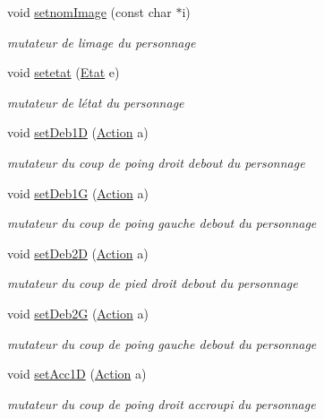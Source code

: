 \begin{DoxyCompactItemize}
void \hyperlink{class_personnage_a3e2eb58dd63ec8701752788c25580d1e}{setnom\+Image} (const char $\ast$i)
\begin{DoxyCompactList}\small\item\em mutateur de l\textquotesingle{}image du personnage \end{DoxyCompactList}\item 
void \hyperlink{class_personnage_af9197f8445b5daf12cee30a869e6ec30}{setetat} (\hyperlink{class_etat}{Etat} e)
\begin{DoxyCompactList}\small\item\em mutateur de l\textquotesingle{}état du personnage \end{DoxyCompactList}\item 
void \hyperlink{class_personnage_a22db8a02ac16afc4853ec0a5b2596f8f}{set\+Deb1D} (\hyperlink{class_action}{Action} a)
\begin{DoxyCompactList}\small\item\em mutateur du coup de poing droit debout du personnage \end{DoxyCompactList}\item 
void \hyperlink{class_personnage_ac320cfe9ec1e62e354bfe44567c11a3b}{set\+Deb1G} (\hyperlink{class_action}{Action} a)
\begin{DoxyCompactList}\small\item\em mutateur du coup de poing gauche debout du personnage \end{DoxyCompactList}\item 
void \hyperlink{class_personnage_aa09f382676ca2832b24ff3ce13722f9f}{set\+Deb2D} (\hyperlink{class_action}{Action} a)
\begin{DoxyCompactList}\small\item\em mutateur du coup de pied droit debout du personnage \end{DoxyCompactList}\item 
void \hyperlink{class_personnage_a7afc1062fc4ebbe529d66e0b0a8d5e84}{set\+Deb2G} (\hyperlink{class_action}{Action} a)
\begin{DoxyCompactList}\small\item\em mutateur du coup de poing gauche debout du personnage \end{DoxyCompactList}\item 
void \hyperlink{class_personnage_aee7eb2a2752f7bec3ef88b39bda2796c}{set\+Acc1D} (\hyperlink{class_action}{Action} a)
\begin{DoxyCompactList}\small\item\em mutateur du coup de poing droit accroupi du personnage \end{DoxyCompactList}\item 

\end{DoxyCompactItemize}
